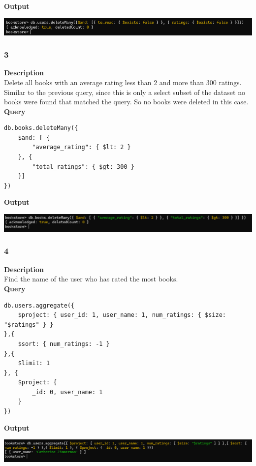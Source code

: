 \documentclass[11pt]{article}
\begin{document}
\linebreak
\textbf{Output}\\
\begin{center}
\includegraphics[width=1\textwidth]{images/WHLJOS001/2.png}
\end{center}
\pagebreak
\subsubsection{3}
\label{sec:orgebb6676}
\textbf{Description}\\
Delete all books with an average rating less than 2 and more than 300 ratings. Similar to the previous query, since this is only a select subset of the dataset no books were found that matched the query. So no books were deleted in this case.\\
\linebreak
\textbf{Query}
\begin{verbatim}
db.books.deleteMany({
    $and: [ {
        "average_rating": { $lt: 2 }
    }, {
        "total_ratings": { $gt: 300 }
    }]
})
\end{verbatim}
\linebreak
\textbf{Output}\\

\begin{center}
\includegraphics[width=1\textwidth]{images/WHLJOS001/3.png}
\end{center}
\pagebreak
\subsubsection{4}
\label{sec:orgc32ebff}
\textbf{Description}\\
Find the name of the user who has rated the most books.\\
\linebreak
\textbf{Query}
\begin{verbatim}
db.users.aggregate({
    $project: { user_id: 1, user_name: 1, num_ratings: { $size: "$ratings" } }
},{
    $sort: { num_ratings: -1 }
},{
    $limit: 1
}, {
    $project: {
        _id: 0, user_name: 1
    }
})
\end{verbatim}

\linebreak
\textbf{Output}\\
\begin{center}
\includegraphics[width=1\textwidth]{images/WHLJOS001/4.png}
\end{center}
\pagebreak
\end{document}
